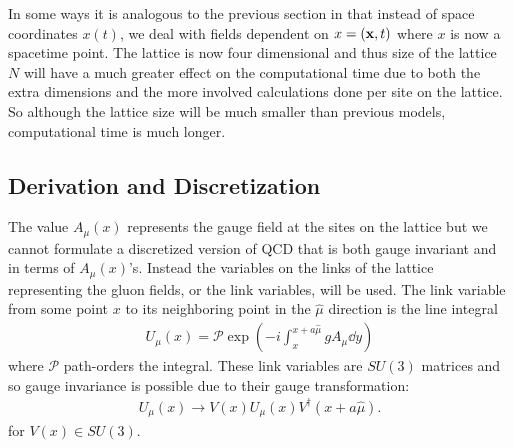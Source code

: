 \documentclass[11pt]{article}
\begin{document}
In some ways it is analogous to the previous section in that instead of space coordinates $x(t)$, we deal with fields dependent on $x=(\vb{x},t)$ where $x$ is now a spacetime point. The lattice is now four dimensional and thus size of the lattice $N$ will have a much greater effect on the computational time due to both the extra dimensions and the more involved calculations done per site on the lattice. So although the lattice size will be much smaller than previous models, computational time is much longer.

\subsection{Derivation and Discretization}
The value $A_\mu(x)$ represents the gauge field at the sites on the lattice but we cannot formulate a discretized version of QCD that is both gauge invariant and in terms of $A_\mu(x)$'s. Instead the variables on the links of the lattice representing the gluon fields, or the link variables, will be used. The link variable from some point $x$ to its neighboring point in the $\hat{\mu}$ direction is the line integral
\begin{align}
	U_\mu(x)=\mathcal{P}\exp\left(-i\int_x^{x+a\hat{\mu}}gA_\mu\dd{y}\right)
\end{align}
where $\mathcal{P}$ path-orders the integral. These link variables are $SU(3)$ matrices and so gauge invariance is possible due to their gauge transformation:
\begin{align}
	U_\mu(x)\to V(x)U_\mu(x)V^\dagger(x+a\hat{\mu}).
\end{align}
for $V(x)\in SU(3)$.
\end{document}
